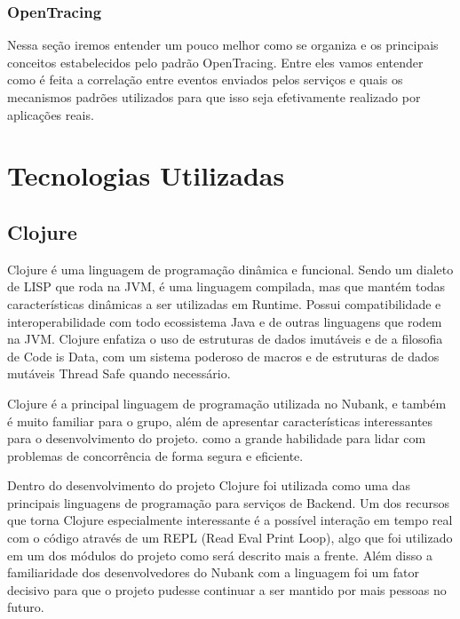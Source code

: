 \documentclass[twosideprint]{politex}
\begin{document}
	\subsection{OpenTracing}
	
	Nessa seção iremos entender um pouco melhor como se organiza e os principais conceitos estabelecidos pelo padrão OpenTracing. Entre eles vamos entender como é feita a correlação entre eventos enviados pelos serviços e quais os mecanismos padrões utilizados para que isso seja efetivamente realizado por aplicações reais.
	
	
 
\chapter{Tecnologias Utilizadas}
	\section{Clojure}
	
	Clojure é uma linguagem de programação dinâmica e funcional. Sendo um dialeto de LISP que roda na JVM, é uma linguagem compilada, mas que mantém todas características dinâmicas a ser utilizadas em Runtime. Possui compatibilidade e interoperabilidade com todo ecossistema Java e de outras linguagens que rodem na JVM. Clojure enfatiza o uso de estruturas de dados imutáveis e de a filosofia de Code is Data, com um sistema poderoso de macros e de estruturas de dados mutáveis Thread Safe quando necessário. \cite{clojurerationale}
	
	Clojure é a principal linguagem de programação utilizada no Nubank, e também é muito familiar para o grupo, além de apresentar características interessantes para o desenvolvimento do projeto. como a grande habilidade para lidar com problemas de concorrência de forma segura e eficiente.
	
	Dentro do desenvolvimento do projeto Clojure foi utilizada como uma das principais linguagens de programação para serviços de Backend. Um dos recursos que torna Clojure especialmente interessante é a possível interação em tempo real com o código através de um REPL (Read Eval Print Loop), algo que foi utilizado em um dos módulos do projeto como será descrito mais a frente. Além disso a familiaridade dos desenvolvedores do Nubank com a linguagem foi um fator decisivo para que o projeto pudesse continuar a ser mantido por mais pessoas no futuro.
	
\end{document}
